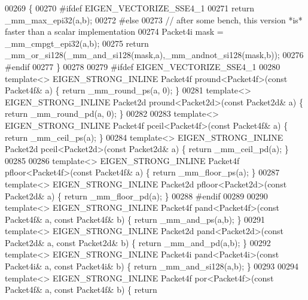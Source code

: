 \begin{DoxyCode}
00269 \{
00270 \textcolor{preprocessor}{#ifdef EIGEN\_VECTORIZE\_SSE4\_1}
00271   \textcolor{keywordflow}{return} \_mm\_max\_epi32(a,b);
00272 \textcolor{preprocessor}{#else}
00273   \textcolor{comment}{// after some bench, this version *is* faster than a scalar implementation}
00274   Packet4i mask = \_mm\_cmpgt\_epi32(a,b);
00275   \textcolor{keywordflow}{return} \_mm\_or\_si128(\_mm\_and\_si128(mask,a),\_mm\_andnot\_si128(mask,b));
00276 \textcolor{preprocessor}{#endif}
00277 \}
00278 
00279 \textcolor{preprocessor}{#ifdef EIGEN\_VECTORIZE\_SSE4\_1}
00280 \textcolor{keyword}{template}<> EIGEN\_STRONG\_INLINE Packet4f pround<Packet4f>(\textcolor{keyword}{const} Packet4f& a) \{ \textcolor{keywordflow}{return} \_mm\_round\_ps(a, 0); \}
00281 \textcolor{keyword}{template}<> EIGEN\_STRONG\_INLINE Packet2d pround<Packet2d>(\textcolor{keyword}{const} Packet2d& a) \{ \textcolor{keywordflow}{return} \_mm\_round\_pd(a, 0); \}
00282 
00283 \textcolor{keyword}{template}<> EIGEN\_STRONG\_INLINE Packet4f pceil<Packet4f>(\textcolor{keyword}{const} Packet4f& a) \{ \textcolor{keywordflow}{return} \_mm\_ceil\_ps(a); \}
00284 \textcolor{keyword}{template}<> EIGEN\_STRONG\_INLINE Packet2d pceil<Packet2d>(\textcolor{keyword}{const} Packet2d& a) \{ \textcolor{keywordflow}{return} \_mm\_ceil\_pd(a); \}
00285 
00286 \textcolor{keyword}{template}<> EIGEN\_STRONG\_INLINE Packet4f pfloor<Packet4f>(\textcolor{keyword}{const} Packet4f& a) \{ \textcolor{keywordflow}{return} \_mm\_floor\_ps(a); \}
00287 \textcolor{keyword}{template}<> EIGEN\_STRONG\_INLINE Packet2d pfloor<Packet2d>(\textcolor{keyword}{const} Packet2d& a) \{ \textcolor{keywordflow}{return} \_mm\_floor\_pd(a); \}
00288 \textcolor{preprocessor}{#endif}
00289 
00290 \textcolor{keyword}{template}<> EIGEN\_STRONG\_INLINE Packet4f pand<Packet4f>(\textcolor{keyword}{const} Packet4f& a, \textcolor{keyword}{const} Packet4f& b) \{ \textcolor{keywordflow}{return} 
      \_mm\_and\_ps(a,b); \}
00291 \textcolor{keyword}{template}<> EIGEN\_STRONG\_INLINE Packet2d pand<Packet2d>(\textcolor{keyword}{const} Packet2d& a, \textcolor{keyword}{const} Packet2d& b) \{ \textcolor{keywordflow}{return} 
      \_mm\_and\_pd(a,b); \}
00292 \textcolor{keyword}{template}<> EIGEN\_STRONG\_INLINE Packet4i pand<Packet4i>(\textcolor{keyword}{const} Packet4i& a, \textcolor{keyword}{const} Packet4i& b) \{ \textcolor{keywordflow}{return} 
      \_mm\_and\_si128(a,b); \}
00293 
00294 \textcolor{keyword}{template}<> EIGEN\_STRONG\_INLINE Packet4f por<Packet4f>(\textcolor{keyword}{const} Packet4f& a, \textcolor{keyword}{const} Packet4f& b) \{ \textcolor{keywordflow}{return} 

\end{DoxyCode}
